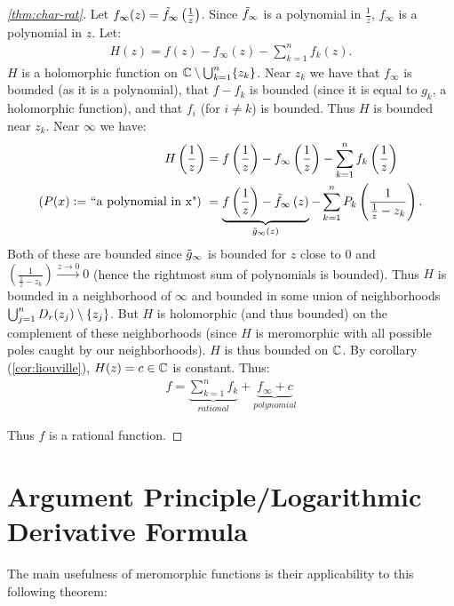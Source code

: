 \begin{proof}[\ref{thm:char-rat}]
Let $f_\infty(z) = \Tilde{f}_\infty\left( \frac{1}{z} \right)$. Since $\Tilde{f}_\infty$ is a polynomial in $\frac{1}{z}$, $f_\infty$ is a polynomial in $z$. Let:
\begin{align*}
    H(z) = f(z) - f_\infty(z) - \sum_{k=1}^n f_k(z).
\end{align*}
 $H$ is a holomorphic function on $\mathbb{C} \setminus \bigcup_{k=1}^n \{z_k \}$. Near $z_k$ we have that $f_\infty$ is bounded (as it is a polynomial), that $f-f_k$ is bounded (since it is equal to $g_k$, a holomorphic function), and that $f_i$ (for $i \neq k$) is bounded. Thus $H$ is bounded near $z_k$. Near $\infty$ we have: 
\begin{align*}
H\left( \frac{1}{z} \right) &= f\left( \frac{1}{z} \right) - f_\infty\left( \frac{1}{z} \right) - \sum_{k=1}^n f_k\left( \frac{1}{z} \right)\\
\text{($P(x) \vcentcolon = $ ``a polynomial in x") } &=\underbrace{f\left( \frac{1}{z} \right) - \Tilde{f}_\infty\left( z \right)}_{\Tilde{g}_\infty (z)} - \sum_{k=1}^n P_k\left( \frac{1}{\frac{1}{z} - z_k} \right).
\end{align*}
Both of these are bounded since $\Tilde{g}_\infty$ is bounded for $z$ close to $0$ and $\left( \frac{1}{\frac{1}{z} - z_k} \right) \xrightarrow[]{z \to 0} 0$ (hence the rightmost sum of polynomials is bounded). Thus $H$ is bounded in a neighborhood of $\infty$ and bounded in some union of neighborhoods $\bigcup_{j=1}^n D_r (z_j) \setminus \{ z_j \}$. But $H$ is holomorphic (and thus bounded) on the complement of these neighborhoods (since $H$ is meromorphic with all possible poles caught by our neighborhoods). $H$ is thus bounded on $\mathbb{C}$. By corollary (\ref{cor:liouville}), $H(z) = c \in \mathbb{C}$ is constant. Thus:
\begin{align*}
    f = \underbrace{\sum_{k=1}^n f_k}_{rational} + \underbrace{f_\infty +c}_{polynomial}
\end{align*}

Thus $f$ is a rational function.
\end{proof}


\section{Argument Principle/Logarithmic Derivative Formula}

The main usefulness of meromorphic functions is their applicability to this following theorem:



